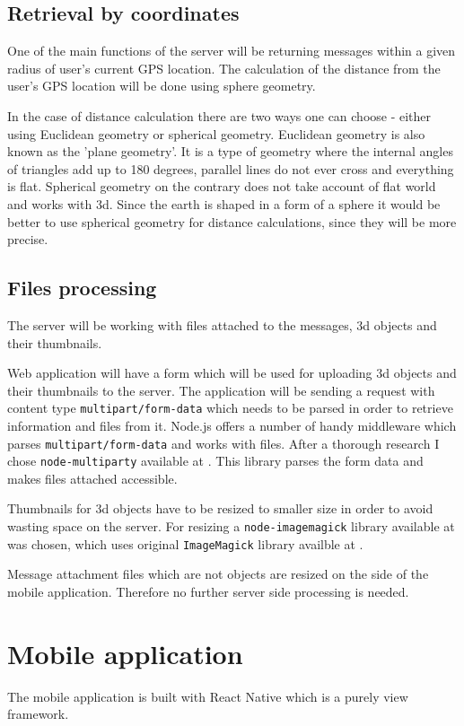 \documentclass[thesis=M,english]{FITthesis}[2012/10/20]
\begin{document}
\subsection{Retrieval by coordinates}

One of the main functions of the server will be returning messages within a given radius of user's current GPS location. The calculation of the distance from the user's GPS location will be done using sphere geometry.

In the case of distance calculation there are two ways one can choose - either using Euclidean geometry or spherical geometry. Euclidean geometry is also known as the 'plane geometry'. It is a type of geometry where the internal angles of triangles add up to 180 degrees, parallel lines do not ever cross and everything is flat. Spherical geometry on the contrary does not take account of flat world and works with 3d. Since the earth is shaped in a form of a sphere it would be better to use spherical geometry for distance calculations, since they will be more precise.

\subsection{Files processing}

The server will be working with files attached to the messages, 3d objects and their thumbnails. 

Web application will have a form which will be used for uploading 3d objects and their thumbnails to the server. The application will be sending a request with content type  \verb|multipart/form-data| which needs to be parsed in order to retrieve information and files from it. Node.js offers a number of handy middleware which parses \verb|multipart/form-data| and works with files. After a thorough research I chose \verb|node-multiparty| available at \cite{multiparty}. This library parses the form data and makes files attached accessible. 

Thumbnails for 3d objects have to be resized to smaller size in order to avoid wasting space on the server. For resizing  a \verb|node-imagemagick| library available at \cite{node-imagemagick} was chosen, which uses original \verb|ImageMagick| library availble at \cite{imagemagick}.

Message attachment files which are not objects are resized on the side of the mobile application. Therefore no further server side processing is needed. 


\section{Mobile application}
The mobile application is built with React Native which is a purely view framework. 
\end{document}
